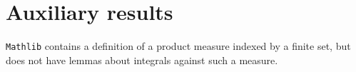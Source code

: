 \chapter{Auxiliary results}
\label{chap:aux}

\texttt{Mathlib} contains a definition of a product measure indexed by a finite set, but does not have lemmas about integrals against such a measure.
